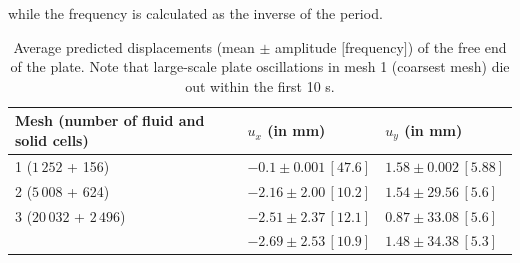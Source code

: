 \documentclass[sn-mathphys,Numbered]{sn-jnl}%
\begin{document}
while the frequency is calculated as the inverse of the period.
\begin{table}[htb]
	\centering
		\begin{tabular}{lll}
			\hline
			Mesh (number of fluid and solid cells) & $u_x$ (in mm) & $u_y$ (in mm) \\
			\hline
			1 ($1\,252$ + 156)  & $ -0.1 \pm 0.001 \,[ 47.6 ]$ & $1.58 \pm 0.002 \,[ 5.88 ]$ \\
			2 ($5\,008$ + 624)  & $-2.16 \pm 2.00 \,[ 10.2 ]$ & $1.54 \pm 29.56 \,[ 5.6 ]$ \\
			3 ($20\,032$ + $2\,496$)  & $-2.51 \pm 2.37 \,[12.1]$ & $0.87 \pm 33.08 \,[ 5.6 ]$ \\
			\hline
			\citet{Turek2006} & $-2.69 \pm 2.53\,[10.9]$ & $1.48 \pm 34.38\,[5.3]$ \\
			\hline
		\end{tabular}
	\caption{Average predicted displacements (mean $\pm$ amplitude $[$frequency$]$) of the free end of the plate. Note that large-scale plate oscillations in mesh 1 (coarsest mesh) die out within the first 10 s.}
		\label{tab:hronTurekDisp}
\end{table}


\end{document}
